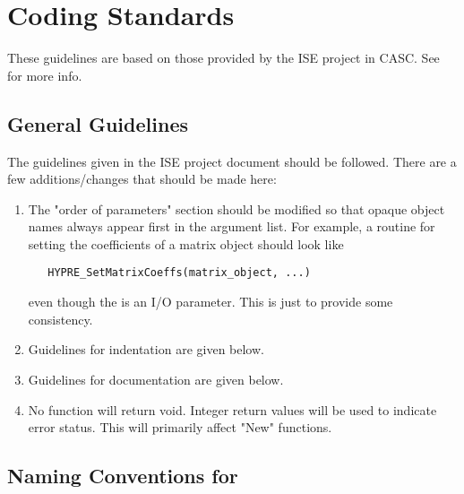 \chapter{Coding Standards}
\label{Coding Standards}

These guidelines are based on those provided by the ISE project in CASC.
See  for more info.

\section{General Guidelines}
\label{General Guidelines}

The guidelines given in the ISE project document 
should be followed.  There are a few additions/changes that should
be made here:
\begin{enumerate}

\item The "order of parameters" section should be modified so that
opaque object names always appear first in the argument list.  For
example, a routine for setting the coefficients of a matrix object
should look like
\begin{verbatim}
   HYPRE_SetMatrixCoeffs(matrix_object, ...)
\end{verbatim}
even though the  is an I/O parameter.  This is just to
provide some consistency.

\item Guidelines for indentation are given below.

\item Guidelines for documentation are given below.

\item No function will return void.  Integer return values will be used
to indicate error status.  This will primarily affect "New" functions.

\end{enumerate}

\section{Naming Conventions for \hypre{}}
\label{Naming Conventions for hypre}

